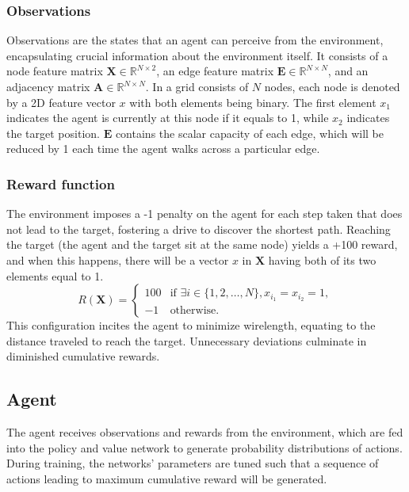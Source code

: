 \documentclass[letterpaper]{article}
\begin{document}
\subsubsection{Observations}
Observations are the states that an agent can perceive from the environment, encapsulating crucial information about the environment itself. It consists of a node feature matrix $\mathbf{X} \in \mathbb{R}^{N \times 2}$, an edge feature matrix $\mathbf{E} \in \mathbb{R}^{N \times N}$, and an adjacency matrix $\mathbf{A} \in \mathbb{R}^{N \times N}$. In a grid consists of $N$ nodes, each node is denoted by a 2D feature vector $x$ with both elements being binary. The first element $x_1$ indicates the agent is currently at this node if it equals to 1, while $x_2$ indicates the target position. $\mathbf{E}$ contains the scalar capacity of each edge, which will be reduced by 1 each time the agent walks across a particular edge. 


\subsubsection{Reward function}
The environment imposes a -1 penalty on the agent for each step taken that does not lead to the target, fostering a drive to discover the shortest path. Reaching the target (the agent and the target sit at the same node) yields a +100 reward, and when this happens, there will be a vector $x$ in $\mathbf{X}$ having both of its two elements equal to 1.
\begin{equation}
    R(\mathbf{X}) = \begin{cases} 
    100 & \text{if } \exists i \in \{1, 2, \ldots, N\}, x_{i_1} = x_{i_2} = 1, \\
    -1 & \text{otherwise}.
    \end{cases}
    \end{equation}
This configuration incites the agent to minimize wirelength, equating to the distance traveled to reach the target. Unnecessary deviations culminate in diminished cumulative rewards.

\subsection{Agent}
The agent receives observations and rewards from the environment, which are fed into the policy and value network to generate probability distributions of actions. During training, the networks' parameters are tuned such that a sequence of actions leading to maximum cumulative reward will be generated. 
\end{document}
